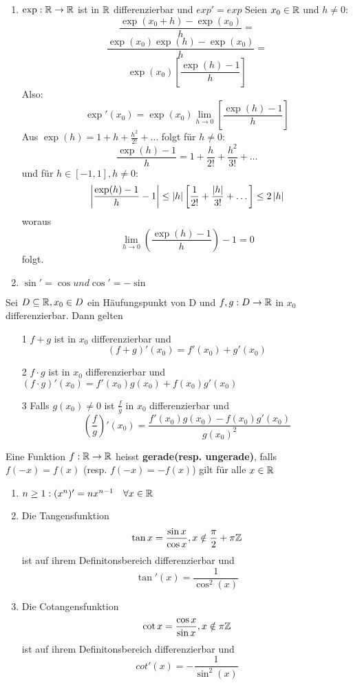 \begin{enumerate}
    \item \( \exp : \mathbb{R} \rightarrow \mathbb{R} \) ist in \( \mathbb{R}\) differenzierbar und \(exp' = exp\)
    Seien \(x_0 \in \mathbb{R}\) und \( h \neq 0:\)
    \[\frac{\exp(x_0 + h)-\exp(x_0)}{h} = \] \newline
    \[\frac{\exp(x_0)\exp(h)-\exp(x_0)}{h} = \] \newline
    \[\exp(x_0) \left[ \frac{\exp(h)-1}{h}\right]\]
    Also: \[ \exp'(x_0) = \exp(x_0) \lim_{h \rightarrow 0} \left[ \frac{\exp(h) - 1}{h}\right]\]
    Aus \( \exp(h) = 1 + h + \frac{h^2}{2!}+ \dots \) folgt für \( h \neq 0\):
    \[\frac{\exp(h) - 1}{h} = 1 + \frac{h}{2!} + \frac{h^2}{3!} + \dots\]
    und für \( h \in [-1,1], h \neq 0\):
    \[ \left\lvert \frac{\exp(h) - 1}{h}-1 \right\rvert \leq \left\lvert h \right\rvert \left[ \frac{1}{2!} + \frac{\left\lvert h \right\rvert}{3!} + \dots \right] \leq 2\left\lvert h \right\rvert\]
    woraus
    \[ \lim_{h \rightarrow 0} \left( \frac{\exp(h) - 1}{h}\right) - 1 = 0\]
    folgt.
    \item \(\sin' = \cos und \cos' = -\sin\)
\end{enumerate}
\Satz[4.9] Sei \(D \subseteq \mathbb{R}, x_0 \in D\) ein Häufungspunkt von D und \(f,g : D \rightarrow \mathbb{R} \) in \(x_0\) differenzierbar. Dann gelten
\begin{enumerate}
    \item [1] \(f + g\) ist in \(x_0 \) differenzierbar und
    \[(f + g)'(x_0) = f'(x_0) + g'(x_0)\]
    \item [2] \(f \cdot g\) ist in \(x_0\) differenzierbar und
    \( (f \cdot g)'(x_0) = f'(x_0)g(x_0) + f(x_0)g'(x_0)\)
    \item [3] Falls \(g(x_0) \neq 0 \) ist \( \frac{f}{g}\) in \(x_0\) differenzierbar und
    \[ \left(\frac{f}{g}\right)'(x_0) = \frac{f'(x_0)g(x_0) - f(x_0)g'(x_0)}{g(x_0)^2}\]
\end{enumerate}
\Def{} Eine Funktion \(f: \mathbb{R} \rightarrow \mathbb{R} \) heisst \newline \textbf{gerade(resp. ungerade)}, falls \( f(-x) = f(x)\) \newline (resp. \(f(-x) = -f(x)\)) gilt für alle \( x \in \mathbb{R}\) \newline
\Bsp[4.10]
\begin{enumerate}
    \item \( n \geq 1: (x^n)' = nx^{n-1} \quad \forall x \in \mathbb{R}\)
    \item Die Tangensfunktion
    \[ \tan x = \frac{\sin x }{\cos x}, x \notin \frac{ \pi}{2} + \pi \mathbb{Z}\]
    ist auf ihrem Definitonsbereich differenzierbar und
    \[ \tan'(x) = \frac{1}{\cos^2(x)}\]
    \item Die Cotangensfunktion
    \[\cot x = \frac{\cos x}{\sin x}, x \notin \pi \mathbb{Z}\]
    ist auf ihrem Definitonsbereich differenzierbar und
    \[ cot'(x) = -\frac{1}{\sin^2(x)}\]
\end{enumerate}
